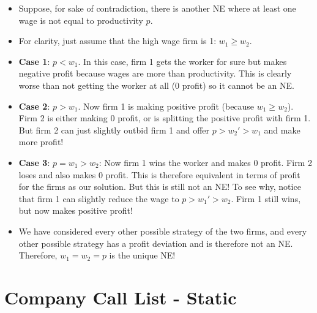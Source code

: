 \documentclass{article}
\begin{document}
\begin{itemize}
    \item Suppose, for sake of contradiction, there is another NE where at least one wage is not equal to productivity $p$.
    \item For clarity, just assume that the high wage firm is 1: $w_1\geq w_2$.
    \item \textbf{Case 1}: $p<w_1$. In this case, firm 1 gets the worker for sure but makes negative profit because wages are more than productivity. This is clearly worse than not getting the worker at all (0 profit) so it cannot be an NE.
    \item \textbf{Case 2}: $p>w_1$. Now firm 1 is making positive profit (because $w_1 \geq w_2$). Firm 2 is either making 0 profit, or is splitting the positive profit with firm 1. But firm 2 can just slightly outbid firm 1 and offer $p>w_2'>w_1$ and make more profit!
    \item \textbf{Case 3}: $p=w_1>w_2$: Now firm 1 wins the worker and makes 0 profit. Firm 2 loses and also makes 0 profit. This is therefore equivalent in terms of profit for the firms as our solution. But this is still not an NE! To see why, notice that firm 1 can slightly reduce the wage to $p>w_1'>w_2$. Firm 1 still wins, but now makes positive profit!
    \item We have considered every other possible strategy of the two firms, and every other possible strategy has a profit deviation and is therefore not an NE. Therefore, $w_1=w_2=p$ is the unique NE!
\end{itemize}



\section{Company Call List - Static}
\end{document}
